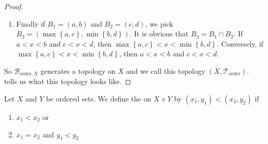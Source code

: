 \begin{proof}
\begin{enumerate}[label=\textbf{\roman*)}]
      \item Finally if \( B_{1} = \left( a,b \right) \) and \( B_{2} = \left( c,d \right) \), we pick \( B_{3} = \left( \max \left\{ a,c \right\}, \min \left\{ b,d \right\} \right) \). It is obvious that \( B_{3} = B_{1}  \cap B_{2} \). If \( a < x< b \) and \( c < x < d \), then \( \max \left\{ {a,c} \right\} < x < \min \left\{ b,d \right\} \). Conversely, if  \( \max \left\{ {a,c} \right\} < x < \min \left\{ b,d \right\} \), then \( a < x< b \) and \( c < x < d \).
    \end{enumerate}
    So \( \mathscr{B}_{\mathrm{order}, X} \) generates a topology on \( X \) and we call this topology \( \left( X, \mathscr{T}_{\mathrm{order}} \right) \).  tells us what this topology looks like.
\end{proof}

\begin{example}
  Let \( X \) and \( Y \) be ordered sets. We define the  on \( X \times Y \) by \( \left( x_{1}, y_{1} \right) < \left( x_{2}, y_{2} \right) \) if 
  \begin{enumerate}[label=\textbf{\roman*)}]
    \item \( x_{1} < x_{2} \) or
    \item \( x_{1} = x_{2} \) and \( y_{1} < y_{2} \)
  \end{enumerate}
\end{example}
